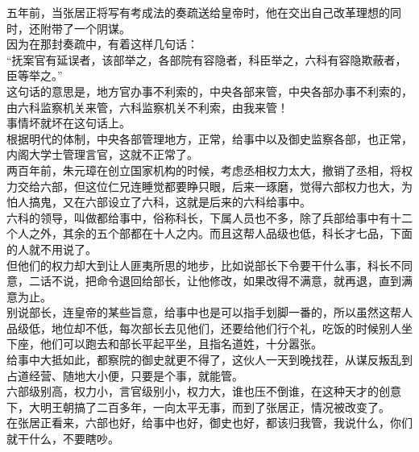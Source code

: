 \begin{multicols}{\theparacolNo}
五年前，当张居正将写有考成法的奏疏送给皇帝时，他在交出自己改革理想的同时，还附带了一个阴谋。\\

因为在那封奏疏中，有着这样几句话：\\

“抚案官有延误者，该部举之，各部院有容隐者，科臣举之，六科有容隐欺蔽者，臣等举之。”\\

这句话的意思是，地方官办事不利索的，中央各部来管，中央各部办事不利索的，由六科监察机关来管，六科监察机关不利索，由我来管！\\

事情坏就坏在这句话上。\\

根据明代的体制，中央各部管理地方，正常，给事中以及御史监察各部，也正常，内阁大学士管理言官，这就不正常了。\\

两百年前，朱元璋在创立国家机构的时候，考虑丞相权力太大，撤销了丞相，将权力交给六部，但这位仁兄连睡觉都要睁只眼，后来一琢磨，觉得六部权力也大，为怕人搞鬼，又在六部设立了六科，这就是后来的六科给事中。\\

六科的领导，叫做都给事中，俗称科长，下属人员也不多，除了兵部给事中有十二个人之外，其余的五个部都在十人之内。而且这帮人品级也低，科长才七品，下面的人就不用说了。\\

但他们的权力却大到让人匪夷所思的地步，比如说部长下令要干什么事，科长不同意，二话不说，把命令退回给部长，让他修改，如果改得不满意，就再退，直到满意为止。\\

别说部长，连皇帝的某些旨意，给事中也是可以指手划脚一番的，所以虽然这帮人品级低，地位却不低，每次部长去见他们，还要给他们行个礼，吃饭的时候别人坐下座，他们可以跑去和部长平起平坐，且指名道姓，十分嚣张。\\

给事中大抵如此，都察院的御史就更不得了，这伙人一天到晚找茬，从谋反叛乱到占道经营、随地大小便，只要是个事，就能管。\\

六部级别高，权力小，言官级别小，权力大，谁也压不倒谁，在这种天才的创意下，大明王朝搞了二百多年，一向太平无事，而到了张居正，情况被改变了。\\

在张居正看来，六部也好，给事中也好，御史也好，都该归我管，我说什么，你们就干什么，不要瞎吵。\\


\end{multicols}
